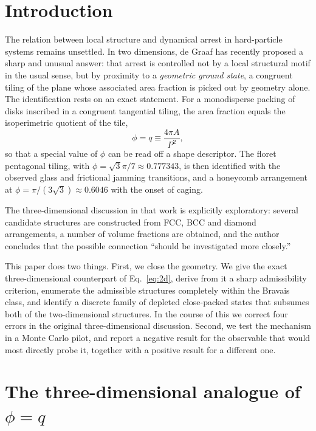 \documentclass[aps,prl,twocolumn,superscriptaddress,floatfix]{revtex4-2}
\begin{document}
\section{Introduction}

The relation between local structure and dynamical arrest in hard-particle
systems remains unsettled. In two dimensions, de Graaf has recently proposed a
sharp and unusual answer: that arrest is controlled not by a local structural
motif in the usual sense, but by proximity to a \emph{geometric ground state}, a
congruent tiling of the plane whose associated area fraction is picked out by
geometry alone. The identification rests on an exact statement. For a
monodisperse packing of disks inscribed in a congruent tangential tiling, the
area fraction equals the isoperimetric quotient of the tile,
\begin{equation}
\phi = q \equiv \frac{4\pi A}{P^2},
\label{eq:2d}
\end{equation}
so that a special value of $\phi$ can be read off a shape descriptor. The floret
pentagonal tiling, with $\phi=\sqrt{3}\pi/7\approx0.777343$, is then identified
with the observed glass and frictional jamming transitions, and a honeycomb
arrangement at $\phi=\pi/(3\sqrt{3})\approx0.6046$ with the onset of caging.

The three-dimensional discussion in that work is explicitly exploratory: several
candidate structures are constructed from FCC, BCC and diamond arrangements, a
number of volume fractions are obtained, and the author concludes that the
possible connection ``should be investigated more closely.''

This paper does two things. First, we close the geometry. We give the exact
three-dimensional counterpart of Eq.~\eqref{eq:2d}, derive from it a sharp
admissibility criterion, enumerate the admissible structures completely within
the Bravais class, and identify a discrete family of depleted close-packed
states that subsumes both of the two-dimensional structures. In the course of
this we correct four errors in the original three-dimensional discussion.
Second, we test the mechanism in a Monte Carlo pilot, and report a negative
result for the observable that would most directly probe it, together with a
positive result for a different one.

\section{The three-dimensional analogue of $\phi=q$}
\label{sec:theorem}
\end{document}
